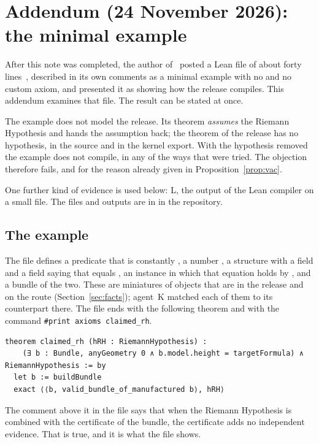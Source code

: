 \section{Addendum (24 November 2026): the minimal example}
\label{sec:addendum}

After this note was completed, the author of \N\ posted a Lean file of about forty lines~\cite{nielsenpost}, described in its own comments as a minimal example with no  and no custom axiom, and presented it as showing how the release compiles.
This addendum examines that file. The result can be stated at once.

\begin{verdictbox}
The example does not model the release. Its theorem \emph{assumes} the Riemann Hypothesis and hands the assumption back; the theorem of the release has no hypothesis, in the source and in the kernel export.
With the hypothesis removed the example does not compile, in any of the ways that were tried.
The objection therefore fails, and for the reason already given in Proposition~\ref{prop:vac}.
\end{verdictbox}

One further kind of evidence is used below: \textsf{L}, the output of the Lean compiler on a small file. The files and outputs are in  in the repository.

\subsection{The example}

The file defines a predicate  that is constantly , a number , a structure with a field  and a field saying that  equals ,
an instance in which that equation holds by , and a bundle of the two.
These are miniatures of objects that are in the release and on the route (Section~\ref{sec:facts}); agent~K matched each of them to its counterpart there.
The file ends with the following theorem and with the command \texttt{\#print axioms claimed\_rh}.
\begin{Verbatim}[fontsize=\small,frame=single,rulecolor=\color{gray!50}]
theorem claimed_rh (hRH : RiemannHypothesis) :
    (∃ b : Bundle, anyGeometry 0 ∧ b.model.height = targetFormula) ∧ RiemannHypothesis := by
  let b := buildBundle
  exact ⟨⟨b, valid_bundle_of_manufactured b⟩, hRH⟩
\end{Verbatim}
\noindent The comment above it in the file says that when the Riemann Hypothesis is combined with the certificate of the bundle, the certificate adds no independent evidence. That is true, and it is what the file shows.

